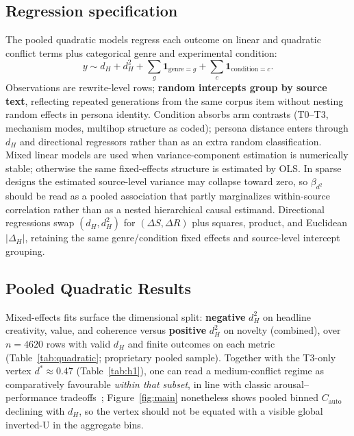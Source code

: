 \documentclass[sigconf,nonacm]{acmart}
\begin{document}
\subsection{Regression specification}

The pooled quadratic models regress each outcome on linear and quadratic conflict terms plus categorical genre and experimental condition:
\[
  y \sim d_H + d_H^2 + \sum_g \mathbf{1}_{\mathrm{genre}=g} + \sum_c \mathbf{1}_{\mathrm{condition}=c}.
\]
Observations are rewrite-level rows; \textbf{random intercepts group by source text}, reflecting repeated generations from the same corpus item without nesting random effects in persona identity. Condition absorbs arm contrasts (T0--T3, mechanism modes, multihop structure as coded); persona distance enters through $d_H$ and directional regressors rather than as an extra random classification. Mixed linear models are used when variance-component estimation is numerically stable; otherwise the same fixed-effects structure is estimated by OLS. In sparse designs the estimated source-level variance may collapse toward zero, so $\beta_{d^2}$ should be read as a pooled association that partly marginalizes within-source correlation rather than as a nested hierarchical causal estimand.
Directional regressions swap $(d_H,d_H^2)$ for $(\Delta S,\Delta R)$ plus squares, product, and Euclidean $|\Delta_H|$, retaining the same genre/condition fixed effects and source-level intercept grouping.

\subsection{Pooled Quadratic Results}

Mixed-effects fits surface the dimensional split: \textbf{negative} $d_H^2$ on headline creativity, value, and coherence versus \textbf{positive} $d_H^2$ on novelty (combined), over $n{=}4620$ rows with valid $d_H$ and finite outcomes on each metric (Table~\ref{tab:quadratic}; proprietary pooled sample).
Together with the T3-only vertex $d^\ast{\approx}0.47$ (Table~\ref{tab:h1}), one can read a medium-conflict regime as comparatively favourable \emph{within that subset}, in line with classic arousal--performance tradeoffs~\cite{yerkes}; Figure~\ref{fig:main} nonetheless shows pooled binned $C_{\mathrm{auto}}$ declining with $d_H$, so the vertex should not be equated with a visible global inverted-U in the aggregate bins.
\end{document}
